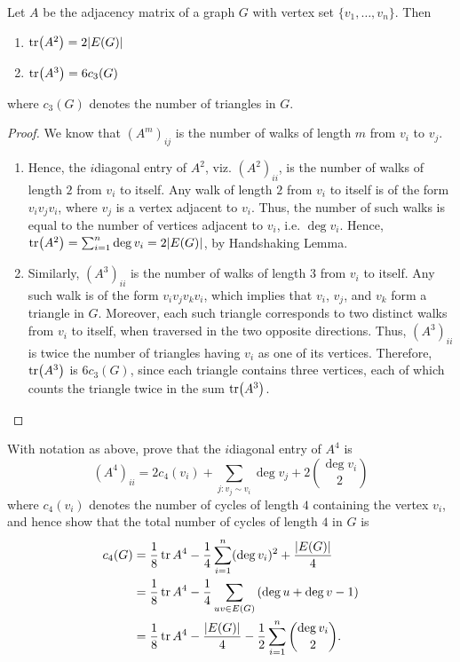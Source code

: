 \begin{Theorem}
Let $A$ be the adjacency matrix of a graph $G$ with vertex set $\{v_1, \ldots, v_n\}$. Then
\begin{enumerate}[label=(\roman*)]
\item $\tr(A^2) = 2 |E(G)|$
\item $\tr(A^3) = 6 c_3(G)$
\end{enumerate}
where $c_3(G)$ denotes the number of triangles in $G$.
\end{Theorem}

\begin{proof}
We know that $(A^m)_{ij}$ is the number of walks of length $m$ from $v_i$ to $v_j$.
\begin{enumerate}[label=(\roman*)]
\item Hence, the $i$\nth diagonal entry of $A^2$, viz. $(A^2)_{ii}$, is the number of walks of length $2$ from $v_i$ to itself. Any walk of length $2$ from $v_i$ to itself is of the form $v_i v_j v_i$, where $v_j$ is a vertex adjacent to $v_i$. Thus, the number of such walks is equal to the number of vertices adjacent to $v_i$, i.e. $\deg v_i$. Hence, $\tr(A^2) = \sum_{i=1}^n \deg v_i = 2|E(G)|$, by Handshaking Lemma.

\item Similarly, $(A^3)_{ii}$ is the number of walks of length $3$ from $v_i$ to itself. Any such walk is of the form $v_i v_j v_k v_i$, which implies that $v_i$, $v_j$, and $v_k$ form a triangle in $G$. Moreover, each such triangle corresponds to two distinct walks from $v_i$ to itself, when traversed in the two opposite directions. Thus, $(A^3)_{ii}$ is twice the number of triangles having $v_i$ as one of its vertices. Therefore, $\tr(A^3)$ is $6 c_3(G)$, since each triangle contains three vertices, each of which counts the triangle twice in the sum $\tr(A^3)$. \qedhere
\end{enumerate}
\end{proof}

\begin{Exercise}
With notation as above, prove that the $i$\nth diagonal entry of $A^4$ is
\begin{equation*}
	(A^4)_{ii} = 2c_4(v_i) + \sum_{j \colon v_j \sim v_i} \deg v_j + 2 \binom{\deg v_i}{2}
\end{equation*}
where $c_4(v_i)$ denotes the number of cycles of length $4$ containing the vertex $v_i$, and hence show that the total number of cycles of length $4$ in $G$ is
\begin{align*}
	c_4(G) & = \frac 1 8 \tr A^4 - \frac 1 4 \sum_{i=1}^{n} (\deg v_i)^2 + \frac{|E(G)|}{4} \\
	& = \frac 1 8 \tr A^4 - \frac 1 4 \sum_{uv \in E(G)} \pqty{\deg u + \deg v - 1} \\
	& = \frac 1 8 \tr A^4 - \frac {|E(G)|} 4 - \frac 1 2 \sum_{i=1}^n \binom {\deg v_i} 2.
\end{align*}
\end{Exercise}


